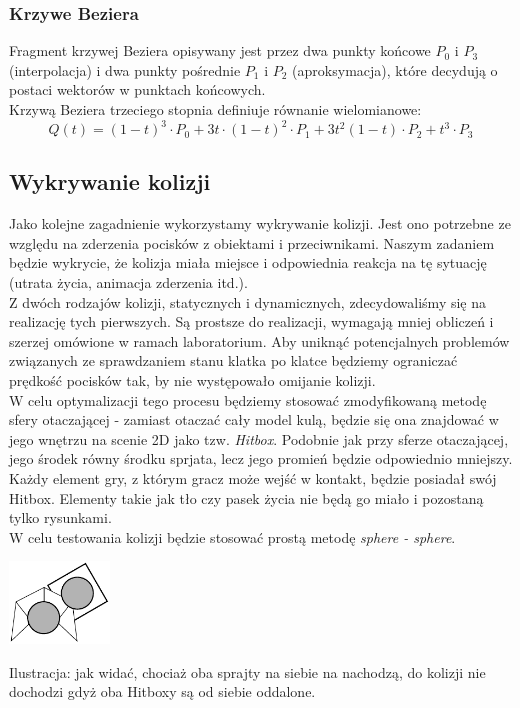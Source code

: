 \documentclass[a4paper,twoside]{article}
\begin{document}
				\subsubsection{Krzywe Beziera}
				Fragment krzywej Beziera opisywany jest przez dwa punkty końcowe $ P_0 $ i $ P_3 $ (interpolacja) i dwa punkty pośrednie $ P_1 $ i $ P_2 $ (aproksymacja), które decydują o postaci wektorów w punktach końcowych.\\Krzywą Beziera trzeciego stopnia definiuje równanie wielomianowe:
				$$ Q(t)=(1-t)^3\cdot P_0+3t\cdot(1-t)^2\cdot P_1+3t^2(1-t)\cdot P_2+t^3\cdot P_3 $$
			
			
		\subsection{Wykrywanie kolizji}
			Jako kolejne zagadnienie wykorzystamy wykrywanie kolizji. Jest ono potrzebne ze względu na zderzenia pocisków z obiektami i przeciwnikami. Naszym zadaniem będzie wykrycie, że kolizja miała miejsce i odpowiednia reakcja na tę sytuację (utrata życia, animacja zderzenia itd.).\\
			Z dwóch rodzajów kolizji, statycznych i dynamicznych, zdecydowaliśmy się na realizację tych pierwszych. Są prostsze do realizacji, wymagają mniej obliczeń i szerzej omówione w ramach laboratorium. Aby uniknąć potencjalnych problemów związanych ze sprawdzaniem stanu klatka po klatce będziemy ograniczać prędkość pocisków tak, by nie występowało omijanie kolizji.\\
			W celu optymalizacji tego procesu będziemy stosować zmodyfikowaną metodę sfery otaczającej - zamiast otaczać cały model kulą, będzie się ona znajdować w jego wnętrzu na scenie 2D jako tzw. \emph{Hitbox}. Podobnie jak przy sferze otaczającej, jego środek równy środku sprjata, lecz jego promień będzie odpowiednio mniejszy. Każdy element gry, z którym gracz może wejść w kontakt, będzie posiadał swój Hitbox. Elementy takie jak tło czy pasek życia nie będą go miało i pozostaną tylko rysunkami.\\
			W celu testowania kolizji będzie stosować prostą metodę \emph{sphere - sphere}.
			
			\begin{center}
				\includegraphics[width=0.2\textwidth]{./images/kolizja}
			\end{center}
			Ilustracja: jak widać, chociaż oba sprajty na siebie na nachodzą, do kolizji nie dochodzi gdyż oba Hitboxy są od siebie oddalone.
		
\end{document}
